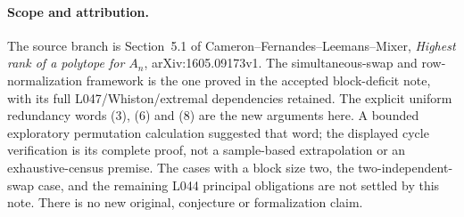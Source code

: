 \documentclass[11pt,a4paper]{article}
\begin{document}
\paragraph{Scope and attribution.}
The source branch is Section~5.1 of Cameron--Fernandes--Leemans--Mixer,
\emph{Highest rank of a polytope for $A_n$}, arXiv:1605.09173v1.
The simultaneous-swap and row-normalization framework is the
one proved in the accepted block-deficit note, with its full
L047/Whiston/extremal dependencies retained. The explicit
uniform redundancy words (3), (6) and (8) are the new arguments here.
A bounded exploratory permutation calculation suggested that
word; the displayed cycle verification is its complete proof,
not a sample-based extrapolation or an exhaustive-census premise.
The cases with a block size two, the two-independent-swap
case, and the remaining L044 principal obligations are not
settled by this note. There is no new original, conjecture or
formalization claim.
\end{document}
